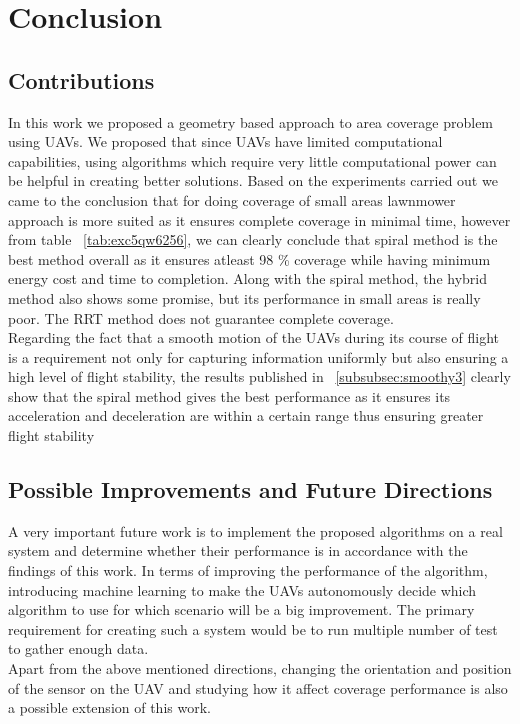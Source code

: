 \section{Conclusion}
\subsection{Contributions}
In this work we proposed a geometry based approach to area coverage problem using UAVs. We proposed that since UAVs have limited computational capabilities, using algorithms which require very little computational power can be helpful in creating better solutions. Based on the experiments carried out we came to the conclusion that for doing coverage of small areas lawnmower approach is more suited as it ensures complete coverage in minimal time, however from table ~\ref{tab:exc5qw6256}, we can clearly conclude that spiral method is the best method overall as it ensures atleast 98 \% coverage while having minimum energy cost and time to completion. Along with the spiral method, the hybrid method also shows some promise, but its performance in small areas is really poor. The RRT method does not guarantee complete coverage. \\
Regarding the fact that a smooth motion of the UAVs during its course of flight is a requirement not only for capturing information uniformly but also ensuring a high level of flight stability, the results published in ~\ref{subsubsec:smoothy3} clearly show that the spiral method gives the best performance as it ensures its acceleration and deceleration are within a certain range thus ensuring greater flight stability

\subsection{Possible Improvements and Future Directions}
A very important future work is to implement the proposed algorithms on a real system and determine whether their performance is in accordance with the findings of this work. In terms of improving the performance of the algorithm, introducing machine learning to make the UAVs autonomously decide which algorithm to use for which scenario will be a big improvement. The primary requirement for creating such a system would be to run multiple number of test to gather enough data. \\

Apart from the above mentioned directions, changing the orientation and position of the sensor on the UAV and studying how it affect coverage performance is also a possible extension of this work.
